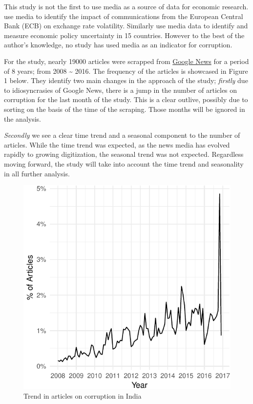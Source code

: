 \documentclass[twoside]{article}
\begin{document}
This study is not the first to use media as a source of data for
economic research. \citet{jansen2005talking} use media to identify the
impact of communications from the European Central Bank (ECB) on
exchange rate volatility. Similarly \citet{baker2015measuring} use media
data to identify and measure economic policy uncertainty in 15
countries. However to the best of the author's knowledge, no study has
used media as an indicator for corruption.

For the study, nearly 19000 articles were scrapped from
\href{\%22https://news.google.com/\%22}{Google News} for a period of 8
years; from 2008 \textasciitilde{} 2016. The frequency of the articles
is showcased in Figure 1 below. They identify two main changes in the
approach of the study; \emph{firstly} due to idiosyncrasies of Google
News, there is a jump in the number of articles on corruption for the
last month of the study. This is a clear outlive, possibly due to
sorting on the basis of the time of the scraping. Those months will be
ignored in the analysis.

\emph{Secondly} we see a clear time trend and a seasonal component to
the number of articles. While the time trend was expected, as the news
media has evolved rapidly to growing digitization, the seasonal trend
was not expected. Regardless moving forward, the study will take into
account the time trend and seasonality in all further analysis.

\begin{figure}[htbp]
\centering
\includegraphics{FinalPaper_files/figure-latex/freqplot-1.pdf}
\caption{Trend in articles on corruption in India}
\end{figure}
\end{document}
